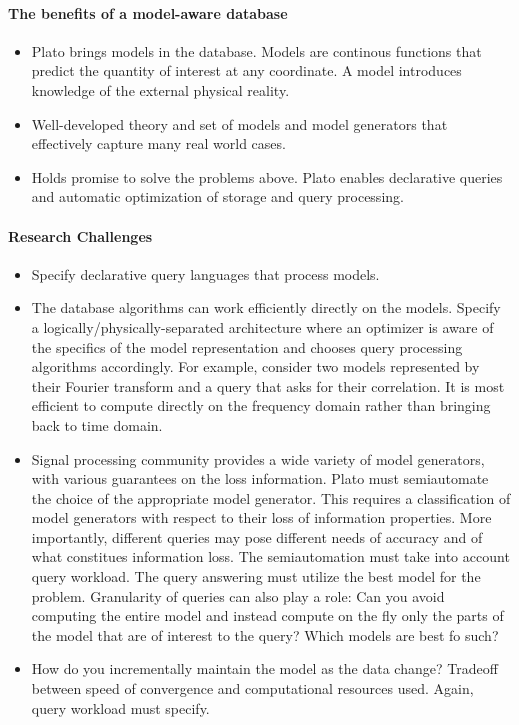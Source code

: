 {\paragraph{The benefits of a model-aware database}

\begin{itemize}
%
\item Plato brings models in the database. Models are continous functions that predict the quantity of interest at any coordinate. A model introduces knowledge of the external physical reality.
%
\item Well-developed theory and set of models and model generators that effectively capture many real world cases.
%
\item Holds promise to solve the problems above. Plato enables declarative queries and automatic optimization of storage and query processing.
%
\end{itemize}

\paragraph{Research Challenges}
\begin{itemize}
%
\item Specify declarative query languages that process models.
%
\item The database algorithms can work efficiently directly on the models. Specify a logically/physically-separated architecture where an optimizer is aware of the specifics of the model representation and chooses query processing algorithms accordingly.  For example, consider two models represented by their Fourier transform and a query that asks for their correlation. It is most efficient to compute directly on the frequency domain rather than bringing back to time domain.
%
\item Signal processing community provides a wide variety of model generators, with various guarantees on the loss information. Plato must semiautomate the choice of the appropriate model generator. This requires a classification of model generators with respect to their loss of information properties. More importantly, different queries may pose different needs of accuracy and of what constitues information loss. The semiautomation must take into account query workload. The query answering must utilize the best model for the problem. Granularity of queries can also play a role: Can you avoid computing the entire model and instead compute on the fly only the parts of the model that are of interest to the query? Which models are best fo such?
%
\item How do you incrementally maintain the model as the data change? Tradeoff between speed of convergence and computational resources used. Again, query workload must specify.
\end{itemize}

}
